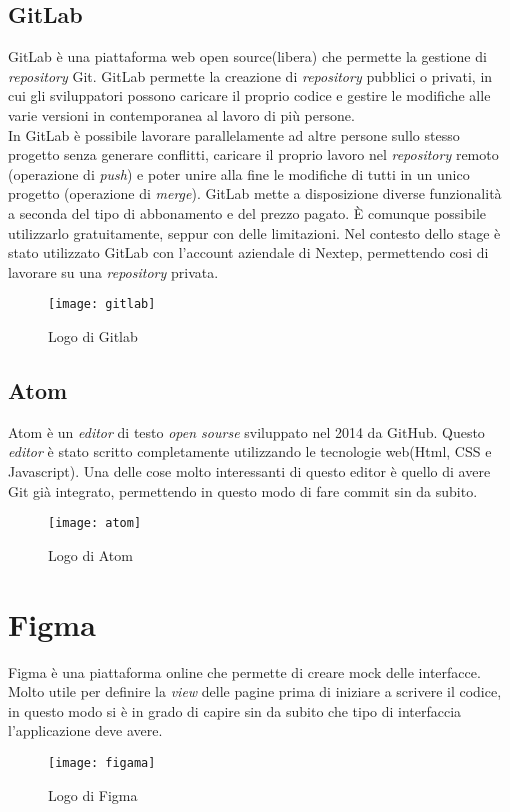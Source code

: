 \subsection{GitLab}GitLab è una piattaforma web open source(libera) che permette la gestione di \emph{repository} Git. GitLab permette la creazione di \emph{repository} pubblici o privati, in cui gli sviluppatori possono caricare il proprio codice e gestire le modifiche alle varie versioni in contemporanea al lavoro di più persone. 
\\

In GitLab è possibile lavorare parallelamente ad altre persone sullo stesso progetto senza generare conflitti, caricare il proprio lavoro nel \emph{repository} remoto (operazione di \emph{push}) e poter unire alla fine le modifiche di tutti in un unico progetto (operazione di \emph{merge}). GitLab mette a disposizione diverse funzionalità a seconda del tipo di abbonamento e del prezzo pagato. È comunque possibile utilizzarlo gratuitamente, seppur con delle limitazioni. Nel contesto dello stage è stato utilizzato GitLab con l'account aziendale di Nextep, permettendo cosi di lavorare su una \emph{repository} privata. 
\begin{figure}[!h] 
	\centering 
	\texttt{[image: gitlab]}
	\caption{Logo di Gitlab}
\end{figure}
\subsection{Atom}
Atom è un \emph{editor} di testo \emph{open sourse} sviluppato nel 2014 da GitHub. Questo \emph{editor} è stato scritto completamente utilizzando le tecnologie web(Html, CSS e Javascript). 
Una delle cose molto interessanti di questo editor è quello di avere Git già integrato, permettendo in questo modo di fare \gls{commit} sin da subito. 
\begin{figure}[!h] 
	\centering 
	\texttt{[image: atom]}
	\caption{Logo di Atom}
\end{figure}
 \section{Figma} Figma è una piattaforma online che permette di creare \gls{mock} delle interfacce. Molto utile per definire la \emph{view} delle pagine prima di iniziare a scrivere il codice, in questo modo si è in grado di capire sin da subito che tipo di interfaccia l'applicazione deve avere.
 \begin{figure}[!h] 
 	\centering 
 	\texttt{[image: figama]}
 	\caption{Logo di Figma}
 \end{figure}
